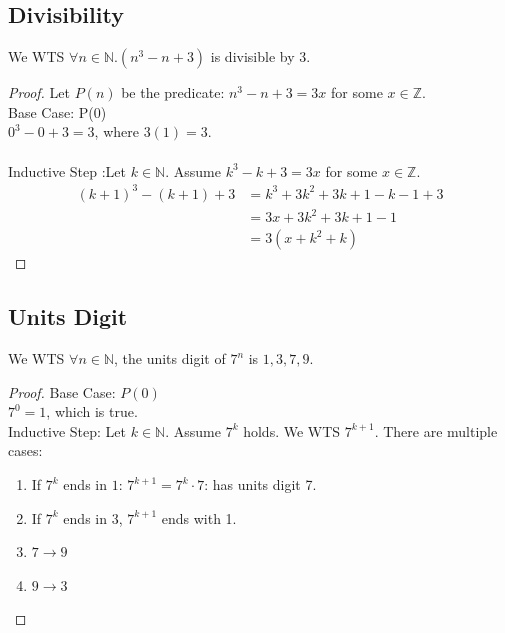 \documentclass{article}
\begin{document}
\subsection{Divisibility}
We WTS $\forall n \in \mathbb{N}. (n^3 - n + 3)$ is divisible by 3.
\begin{proof}
Let $P(n)$ be the predicate: $n^3 - n + 3 = 3x$ for some $x \in \mathbb{Z}$.\\
Base Case: P(0)\\
$0^3 - 0 + 3 = 3$, where $3(1) = 3$.\\
\\
Inductive Step :Let $k \in \mathbb{N}$. Assume $k^3 - k + 3 = 3x$ for some $x \in \mathbb{Z}$.
\begin{align*}
    (k+1)^3 - (k + 1) + 3 & = k^3 + 3k^2 + 3k + 1 - k - 1 + 3\\
    & = 3x + 3k^2 + 3k + 1  - 1\\
    & = 3(x + k^2 + k)
\end{align*}
\end{proof}
\subsection{Units Digit}
We WTS $\forall n \in \mathbb{N}$, the units digit of $7^n$ is $1, 3, 7, 9$.
\begin{proof}
Base Case: $P(0)$\\
$7^0 = 1$, which is true.
\\
Inductive Step: Let $k \in \mathbb{N}$. Assume $7^k$ holds. We WTS $7^{k + 1}$. There are multiple cases:
\begin{enumerate}
    \item If $7^k$ ends in $1$: $7^{k + 1} = 7^k \cdot 7$: has units digit 7.
    \item If $7^k$ ends in 3, $7^{k + 1}$ ends with 1.
    \item $7 \to 9$
    \item $9 \to 3$
\end{enumerate}
\end{proof}
\end{document}
